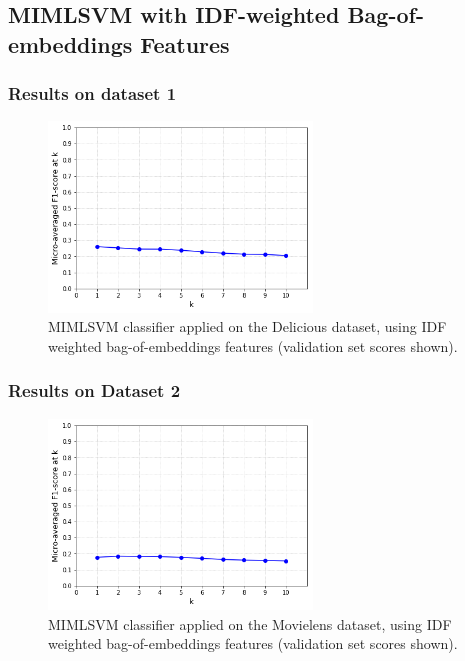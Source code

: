 \subsection{MIMLSVM with IDF-weighted Bag-of-embeddings Features}

\subsubsection{Results on dataset 1}

\begin{figure}[H]
    \centering
    \includegraphics[width=7cm]{chapters/05_experiments/images/delicious-mimlsvm-embeddings.png}
    \caption{MIMLSVM classifier applied on the Delicious dataset, using IDF weighted bag-of-embeddings features (validation set scores shown).}
    \label{fig:movielens_mimlsvm_embeddings}
\end{figure}

\subsubsection{Results on Dataset 2}

\begin{figure}[H]
    \centering
    \includegraphics[width=7cm]{chapters/05_experiments/images/movielens-mimlsvm-embeddings.png}
    \caption{MIMLSVM classifier applied on the Movielens dataset, using IDF weighted bag-of-embeddings features (validation set scores shown).}
    \label{fig:movielens_mimlsvm_embeddings}
\end{figure}

